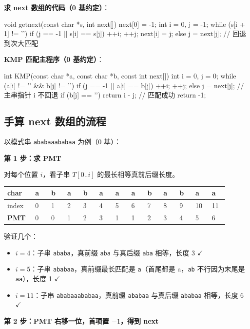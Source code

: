 \documentclass[11pt,openany,UTF8]{ctexbook}
\begin{document}
\textbf{求 next 数组的代码（0 基约定）}：

\begin{codebox}
void getnext(const char *s, int next[]) {
    next[0] = -1;
    int i = 0, j = -1;
    while (s[i + 1] != '\0') {
        if (j == -1 || s[i] == s[j]) {
            ++i; ++j;
            next[i] = j;
        } else {
            j = next[j];      // 回退到次大匹配
        }
    }
}
\end{codebox}

\textbf{KMP 匹配主程序（0 基约定）}：

\begin{codebox}
int KMP(const char *a, const char *b, const int next[]) {
    int i = 0, j = 0;
    while (a[i] != '\0' && b[j] != '\0') {
        if (j == -1 || a[i] == b[j]) { ++i; ++j; }
        else { j = next[j]; }     // 主串指针 i 不回退
    }
    if (b[j] == '\0') return i - j;   // 匹配成功
    return -1;
}
\end{codebox}

\subsection{手算 next 数组的流程}

以模式串 \texttt{ababaaababaa} 为例（0 基）：

\textbf{第 1 步：求 PMT}

对每个位置 $i$，看子串 $T[0..i]$ 的最长相等真前后缀长度。

\begingroup\footnotesize\setlength{\tabcolsep}{1.5pt}
\begin{longtable}{@{}L{0.0689\linewidth}L{0.0689\linewidth}L{0.0689\linewidth}L{0.0689\linewidth}L{0.0689\linewidth}L{0.0689\linewidth}L{0.0689\linewidth}L{0.0689\linewidth}L{0.0689\linewidth}L{0.0689\linewidth}L{0.0689\linewidth}L{0.0689\linewidth}L{0.0689\linewidth}@{}}
\toprule
\textbf{char} & \textbf{a} & \textbf{b} & \textbf{a} & \textbf{b} & \textbf{a} & \textbf{a} & \textbf{a} & \textbf{b} & \textbf{a} & \textbf{b} & \textbf{a} & \textbf{a} \\
\midrule
\endhead
index & 0 & 1 & 2 & 3 & 4 & 5 & 6 & 7 & 8 & 9 & 10 & 11 \\
\textbf{PMT} & 0 & 0 & 1 & 2 & 3 & 1 & 1 & 2 & 3 & 4 & 5 & 6 \\
\bottomrule
\end{longtable}
\endgroup

验证几个：

\begin{itemize}
\item $i=4$：子串 \texttt{ababa}，真前缀 \texttt{aba} 与真后缀 \texttt{aba} 相等，长度 3 $\checkmark$
\item $i=5$：子串 \texttt{ababaa}，真前缀最长匹配是 \texttt{a}（首尾都是 a，\texttt{ab} 不行因为末尾是 \texttt{aa}），长度 1 $\checkmark$
\item $i=11$：子串 \texttt{ababaaababaa}，真前缀 \texttt{ababaa} 与真后缀 \texttt{ababaa} 相等，长度 6 $\checkmark$
\end{itemize}
\textbf{第 2 步：PMT 右移一位，首项置 $-1$，得到 next}
\end{document}
